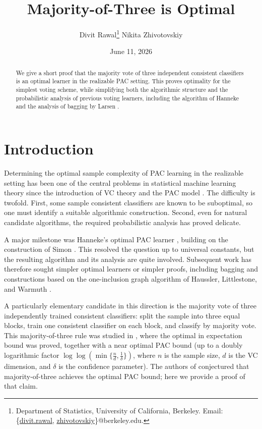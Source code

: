 \documentclass[11pt]{article}
\title{Majority-of-Three is Optimal}
\author{
Divit Rawal\thanks{Department of Statistics, University of California, Berkeley. Email: \{\href{mailto:divit.rawal@berkeley.edu}{divit.rawal}, \href{mailto:zhivotovskiy@berkeley.edu}{zhivotovskiy}\}@berkeley.edu.}
\quad
Nikita Zhivotovskiy\footnotemark[2]
}
\date{June 11, 2026}
\newcommand{\1}{\mathbf 1}
\theoremstyle{plain}
\theoremstyle{remark}
\begin{document}
\maketitle

\begin{abstract}
We give a short proof that the majority vote of three independent consistent classifiers is an optimal learner in the realizable PAC setting. This proves optimality for the simplest voting scheme, while simplifying both the algorithmic structure and the probabilistic analysis of previous voting learners, including the algorithm of Hanneke \cite{Hanneke2016} and the analysis of bagging by Larsen \cite{Larsen2023Bagging}. 
\end{abstract}

\section{Introduction}

Determining the optimal sample complexity of PAC learning in the realizable setting has been one of the central problems in statistical machine learning theory since the introduction of VC theory and the PAC model \cite{VapnikChervonenkis1971,Valiant1984,BlumerEhrenfeuchtHausslerWarmuth1989}.  The difficulty is twofold.  First, some 
sample consistent classifiers are known to be suboptimal, so one must identify a suitable algorithmic construction.  Second, even for natural candidate algorithms, the required probabilistic analysis has proved delicate.

A major milestone was Hanneke's optimal PAC learner \cite{Hanneke2016}, building on the construction of Simon \cite{Simon2015}.  This resolved the question up to universal constants, but the resulting algorithm and its analysis are quite involved.  Subsequent work has therefore sought simpler optimal learners or simpler proofs, including bagging \cite{Larsen2023Bagging} and constructions based on the one-inclusion graph algorithm of Haussler, Littlestone, and Warmuth \cite{HausslerLittlestoneWarmuth1994,AdenAliCherapanamjeriShettyZhivotovskiy2023OIGNotAlwaysOptimal, AdenAliCherapanamjeriShettyZhivotovskiy2023OptimalPACNoUC}. 

A particularly elementary candidate in this direction is the majority vote of three independently trained consistent classifiers: split the sample into three equal blocks, train one consistent classifier on each block, and classify by majority vote.  This majority-of-three rule was studied in \cite{AdenAliHogsgaardLarsenZhivotovskiy2024}, where the optimal in expectation bound was proved, together with a near optimal PAC bound (up to a doubly logarithmic factor $\log\log(\min\{\frac{n}{d}, \frac{1}{\delta}\})$, where $n$ is the sample size, $d$ is the VC dimension, and $\delta$ is the confidence parameter). The authors of \cite{AdenAliHogsgaardLarsenZhivotovskiy2024} conjectured that majority-of-three achieves the optimal PAC bound; here we provide a proof of that claim.
\end{document}
